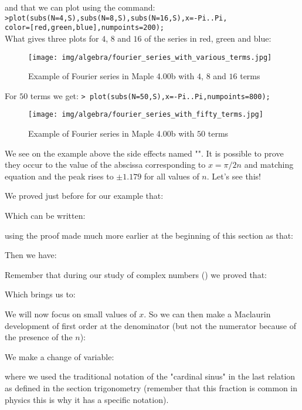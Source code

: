 	\pagebreak
	\begin{tcolorbox}[colframe=black,colback=white,sharp corners]
	and that we can plot using the command:\\
	
	\texttt{>plot({subs(N=4,S),subs(N=8,S),subs(N=16,S)},x=-Pi..Pi,\\
	color=[red,green,blue],numpoints=200);}\\
	
	What gives three plots for $4$, $8$ and $16$ of the series in red, green and blue:
	\begin{figure}[H]
		\centering
		\texttt{[image: img/algebra/fourier\_series\_with\_various\_terms.jpg]}
		\caption{Example of Fourier series in Maple 4.00b with $4$, $8$ and $16$ terms}
	\end{figure}
	For $50$ terms we get:
	\texttt{> plot(subs(N=50,S),x=-Pi..Pi,numpoints=800);}\\
	\begin{figure}[H]
		\centering
		\texttt{[image: img/algebra/fourier\_series\_with\_fifty\_terms.jpg]}
		\caption{Example of Fourier series in Maple 4.00b with $50$ terms}
	\end{figure}
	\end{tcolorbox}
	We see on the example above the side effects named "". It is possible to prove they occur to the value of the abscissa corresponding to $x=\pi/2n$ and matching equation and the peak rises to $\pm 1.179$ for all values of $n$. Let's see this!
	
	We proved just before for our example that:
	
	Which can be written:
	
	using the proof made much more earlier at the beginning of this section as that:
	
	Then we have:
	
	Remember that during our study of complex numbers () we proved that:
	
	Which brings us to:
	
	We will now focus on small values of $x$. So we can then make a Maclaurin  development of first order at the denominator (but not the numerator because of the presence of the $n$):
	
	We make a change of variable:
	
	where we used the traditional notation of the "cardinal sinus" in the last relation as defined in the section trigonometry (remember that this fraction is common in physics this is why it has a specific notation).
	
